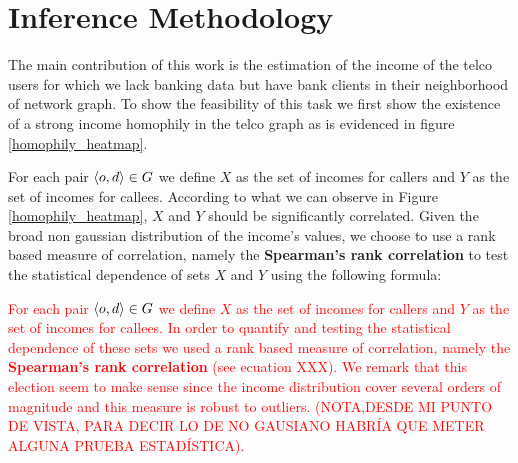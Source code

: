 \section{Inference Methodology}






The main contribution of this work is the estimation of the income of the telco users for which we lack banking data but have bank clients in their neighborhood of network graph. To show the feasibility of this task we first show the existence of a strong income homophily in the telco graph as is evidenced in figure \ref{homophily_heatmap}.

For each pair \( \left< o, d \right> \in \mathlarger{G} \) we define \( X \) as the set of incomes for callers and \( Y \) as the set of incomes for callees. According to what we can observe in Figure \ref{homophily_heatmap}, \( X \) and \( Y \) should be significantly correlated. Given the broad non gaussian distribution of the income's values, we choose to use a rank based measure of correlation, namely the \textbf{Spearman's rank correlation} to test the statistical dependence of sets \( X \) and \( Y \) using the following formula: 

\textcolor{red}{
For each pair \( \left< o, d \right> \in \mathlarger{G} \) we define \( X \) as the set of incomes for callers and \( Y \) as the set of incomes for callees. In order to quantify and testing the statistical dependence of these sets we used a rank based measure of correlation, namely the \textbf{Spearman's rank correlation} (see ecuation XXX). We remark that this election seem to make sense since the income distribution cover several orders of magnitude and this measure is robust to outliers. (NOTA,DESDE MI PUNTO DE VISTA, PARA DECIR LO DE NO GAUSIANO HABRÍA QUE METER ALGUNA PRUEBA ESTADÍSTICA). 
}

